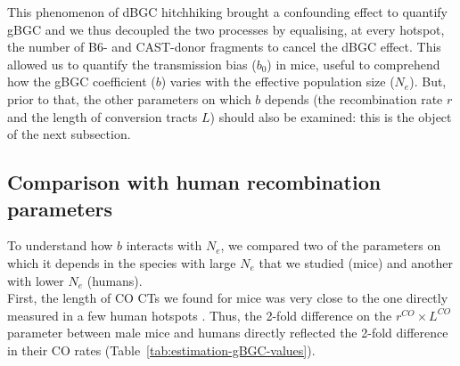 %


This phenomenon of dBGC hitchhiking brought a confounding effect to quantify gBGC and we thus decoupled the two processes by equalising, at every hotspot, the number of B6- and CAST-donor fragments to cancel the dBGC effect.
This allowed us to quantify the transmission bias ($b_0$) in mice, useful to comprehend how the gBGC coefficient ($b$) varies with the effective population size ($N_e$).
But, prior to that, the other parameters on which $b$ depends (the recombination rate $r$ and the length of conversion tracts $L$) should also be examined: this is the object of the next subsection.
 




\subsection{Comparison with human recombination parameters}

To understand how $b$ interacts with $N_e$, we compared two of the parameters on which it depends in the species with large $N_e$ that we studied (mice) and another with lower $N_e$ (humans).\\

First, the length of CO CTs we found for mice was very close to the one directly measured in a few human hotspots \citep{jeffreys2004intense}.
Thus, the 2-fold difference on the $r^{CO} \times L^{CO}$ parameter between male mice and humans directly reflected the 2-fold difference in their CO rates (Table~\ref{tab:estimation-gBGC-values}).


